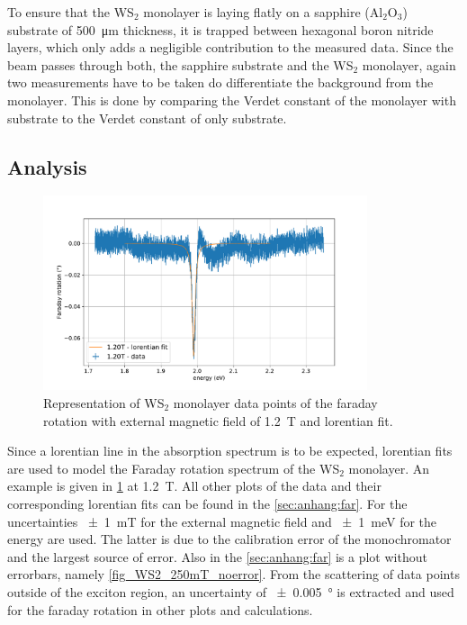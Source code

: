To ensure that the WS$_2$ monolayer is laying flatly on a sapphire ($\text{Al}_2\text{O}_3$) substrate of \SI{500}{\micro\meter} thickness, it is trapped between hexagonal boron nitride layers, which only adds a negligible contribution to the measured data.
Since the beam passes through both, the sapphire substrate and the WS$_2$ monolayer, again two measurements have to be taken do differentiate the background from the monolayer.
This is done by comparing the Verdet constant of the monolayer with substrate to the Verdet constant of only substrate.

\subsection{Analysis}

\begin{figure}[!ht]
    \centering
    \includegraphics[width=0.85\textwidth]{plots/WS2_1200mT.pdf}
    \caption{Representation of WS$_2$ monolayer data points of the faraday rotation with external magnetic field of \SI{1.2}{\tesla} and lorentian fit.}
    \label{fig_WS2_1200mT}
\end{figure}
Since a lorentian line in the absorption spectrum is to be expected, lorentian fits are used to model the Faraday rotation spectrum of the WS$_2$ monolayer.
An example is given in \cref{fig_WS2_1200mT} at \SI{1.2}{\tesla}.
All other plots of the data and their corresponding lorentian fits can be found in the \cref{sec:anhang:far}.
For the uncertainties \SI{+-1}{\milli\tesla} for the external magnetic field and \SI{+-1}{\milli\electronvolt} for the energy are used.
The latter is due to the calibration error of the monochromator and the largest source of error.
Also in the \cref{sec:anhang:far} is a plot without errorbars, namely \cref{fig_WS2_250mT_noerror}.
From the scattering of data points outside of the exciton region, an uncertainty of \SI{+-0.005}{\degree} is extracted and used for the faraday rotation in other plots and calculations.

